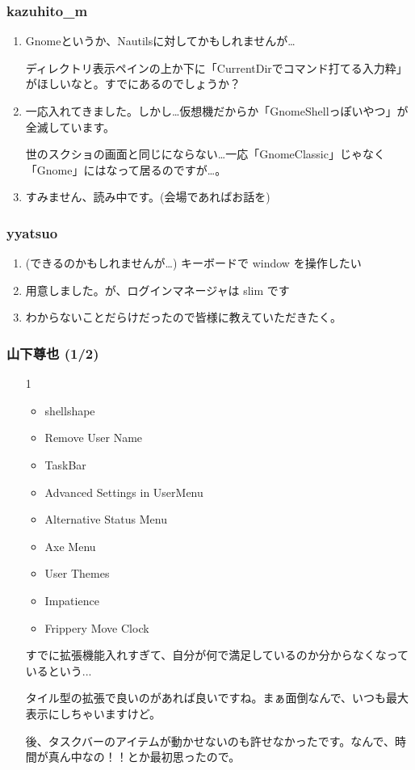 \documentclass[cjk,dvipdfmx,10pt,compress,%
hyperref={bookmarks=true,bookmarksnumbered=true,bookmarksopen=false,%
colorlinks=false,%
pdftitle={第 70 回 関西 Debian 勉強会},%
pdfauthor={倉敷・のがた・佐々木・かわだ・八津尾},%
pdfsubject={資料},%
}]{beamer}
\begin{document}
\begin{frame}
  \frametitle{kazuhito\_m}
  \begin{enumerate}
  \item Gnomeというか、Nautilsに対してかもしれませんが…

    ディレクトリ表示ペインの上か下に「CurrentDirでコマンド打てる入力粋」がほしいなと。すでにあるのでしょうか？
  \item 一応入れてきました。しかし…仮想機だからか「GnomeShellっぽいやつ」が全滅しています。

    世のスクショの画面と同じにならない…一応「GnomeClassic」じゃなく「Gnome」にはなって居るのですが…。 
  \item すみません、読み中です。(会場であればお話を)
  \end{enumerate}
\end{frame}

\begin{frame}
  \frametitle{yyatsuo}
  \begin{enumerate}
  \item  (できるのかもしれませんが…) キーボードで window を操作したい 
  \item 用意しました。が、ログインマネージャは slim です
  \item わからないことだらけだったので皆様に教えていただきたく。
  \end{enumerate}
\end{frame}

\begin{frame}
  \frametitle{山下尊也 (1/2)}
  \begin{enumerate}
  \item[1]
    \begin{itemize}
    \item shellshape
    \item Remove User Name
    \item TaskBar
    \item Advanced Settings in UserMenu
    \item Alternative Status Menu
    \item Axe Menu
    \item User Themes
    \item Impatience
    \item Frippery Move Clock
  \end{itemize}
  すでに拡張機能入れすぎて、自分が何で満足しているのか分からなくなっているという...

  タイル型の拡張で良いのがあれば良いですね。まぁ面倒なんで、いつも最大表示にしちゃいますけど。

  後、タスクバーのアイテムが動かせないのも許せなかったです。なんで、時間が真ん中なの！！とか最初思ったので。
  \end{enumerate}
\end{frame}
\end{document}
